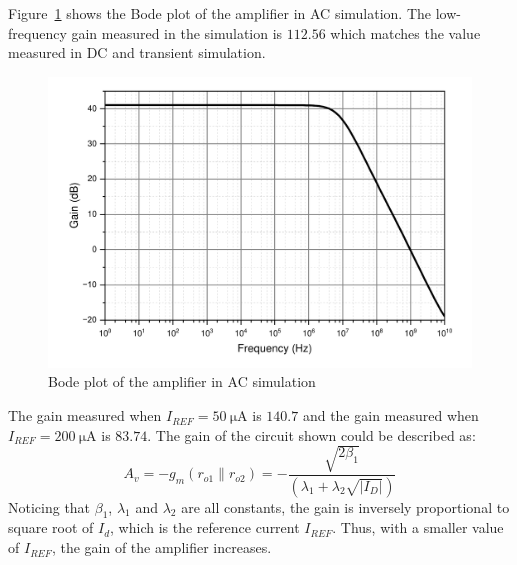 \documentclass[12pt]{article}   %
\begin{document}
	Figure~\ref{fig:mixedAmpAc} shows the Bode plot of the amplifier in AC simulation. The low-frequency gain measured in the simulation is $112.56$ which matches the value measured in DC and transient simulation.
	
	\begin{figure}[htbp]
		\centering
		\includegraphics[width=0.7\linewidth]{Figures/E3_Current_Mirror/mixed_amp_ac}
		\caption{Bode plot of the amplifier in AC simulation}
		\label{fig:mixedAmpAc}
	\end{figure}
	
	The gain measured when $I_{REF} = \SI{50}{\micro\ampere}$ is $140.7$ and the gain measured when $I_{REF} = \SI{200}{\micro\ampere}$ is $83.74$. The gain of the circuit shown could be described as:
	\begin{equation}
		A_v = - g_m \left(r_{o1} \parallel r_{o2}\right) = - \frac{\sqrt{2\beta_1}}{\left(\lambda_1 + \lambda_2 \sqrt{\left|I_{D}\right|}\right)}
	\end{equation}
	Noticing that $\beta_1$, $\lambda_1$ and $\lambda_2$ are all constants, the gain is inversely proportional to square root of $I_d$, which is the reference current $I_{REF}$. Thus, with a smaller value of $I_{REF}$, the gain of the amplifier increases.
	
\end{document}

